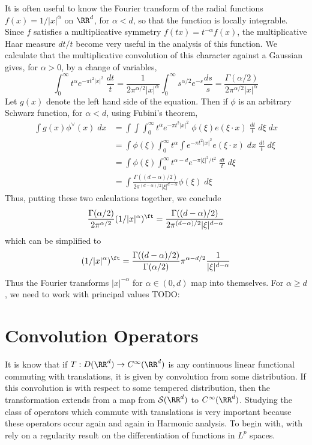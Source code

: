\begin{example}
    It is often useful to know the Fourier transform of the radial functions $f(x) = 1/|x|^\alpha$ on $\RR^d$, for $\alpha < d$, so that the function is locally integrable. Since $f$ satisfies a multiplicative symmetry $f(tx) = t^{-\alpha} f(x)$, the multiplicative Haar measure $dt/t$ become very useful in the analysis of this function. We calculate that the multiplicative convolution of this character against a Gaussian gives, for $\alpha > 0$, by a change of variables,
    \[ \int_0^\infty t^\alpha e^{- \pi t^2 |x|^2}\; \frac{dt}{t} = \frac{1}{2\pi^{\alpha/2} |x|^\alpha} \int_0^\infty s^{\alpha/2} e^{-s} \frac{ds}{s} = \frac{\Gamma(\alpha/2)}{2 \pi^{\alpha/2} |x|^\alpha} \]
    Let $g(x)$ denote the left hand side of the equation. Then if $\phi$ is an arbitrary Schwarz function, for $\alpha < d$, using Fubini's theorem,
    \begin{align*}
        \int g(x) \phi^\vee(x)\; dx &= \int \int \int_0^\infty t^\alpha e^{- \pi t^2 |x|^2}\; \phi(\xi) e(\xi \cdot x)\; \frac{dt}{t}\; d\xi\; dx\\
        &= \int \phi(\xi) \int_0^\infty t^\alpha \int e^{- \pi t^2 |x|^2} e(\xi \cdot x)\; dx\; \frac{dt}{t}\; d\xi\\
        &= \int \phi(\xi) \int_0^\infty t^{\alpha - d} e^{- \pi |\xi|^2/t^2}\; \frac{dt}{t}\; d\xi\\
        &= \int \frac{\Gamma((d-\alpha)/2)}{2\pi^{(d-\alpha)/2} |\xi|^{d - \alpha}} \phi(\xi)\; d\xi
    \end{align*}
    Thus, putting these two calculations together, we conclude
    \[ \frac{\Gamma(\alpha/2)}{2 \pi^{\alpha/2}} (1/|x|^\alpha)^\ft = \frac{\Gamma((d-\alpha)/2)}{2 \pi^{(d-\alpha)/2} |\xi|^{d-\alpha}} \]
    which can be simplified to
    \[ (1/|x|^\alpha)^\ft = \frac{\Gamma((d-\alpha)/2)}{\Gamma(\alpha/2)} \pi^{\alpha-d/2} \frac{1}{|\xi|^{d-\alpha}} \]
    Thus the Fourier transforms $|x|^{-\alpha}$ for $\alpha \in (0,d)$ map into themselves. For $\alpha \geq d$, we need to work with principal values TODO:
\end{example}

\section{Convolution Operators}

It is know that if $T: D(\RR^d) \to C^\infty(\RR^d)$ is any continuous linear functional commuting with translations, it is given by convolution from some distribution. If this convolution is with respect to some tempered distribution, then the transformation extends from a map from $\mathcal{S}(\RR^d)$ to $C^\infty(\RR^d)$. Studying the class of operators which commute with translations is very important because these operators occur again and again in Harmonic analysis. To begin with, with rely on a regularity result on the differentiation of functions in $L^p$ spaces.

